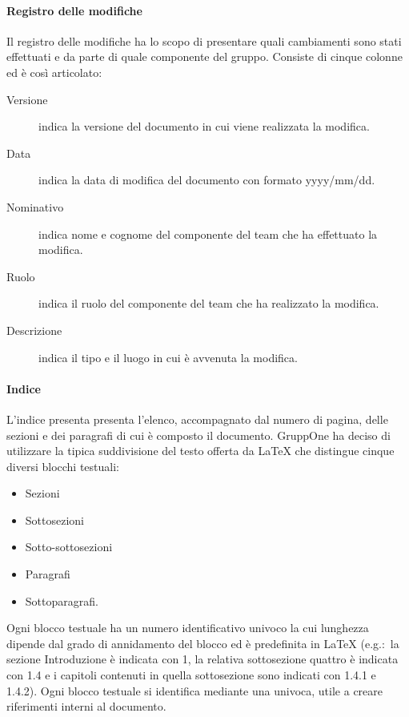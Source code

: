 \documentclass[../norme-di-progetto.tex]{subfiles}
\begin{document}
\paragraph{Registro delle modifiche}%
\label{par:registro_delle_modifiche}
Il registro delle modifiche ha lo scopo di presentare quali cambiamenti sono stati effettuati e da parte di quale componente del gruppo. Consiste di cinque colonne ed è così articolato:
\begin{description}
  \item [Versione] indica la versione del documento in cui viene realizzata la modifica.
  \item [Data] indica la data di modifica del documento con formato yyyy/mm/dd.
  \item [Nominativo] indica nome e cognome del componente del team che ha effettuato la modifica.
  \item [Ruolo] indica il ruolo del componente del team che ha realizzato la modifica.
  \item [Descrizione] indica il tipo e il luogo in cui è avvenuta la modifica.
\end{description}

\paragraph{Indice}%
\label{par:indice}
L'indice presenta presenta l'elenco, accompagnato dal numero di pagina, delle sezioni e dei paragrafi di cui è composto il documento.
GruppOne ha deciso di utilizzare la tipica suddivisione del testo offerta da \LaTeX{} che distingue cinque diversi blocchi testuali:
\begin{itemize}
  \item Sezioni
  \item Sottosezioni
  \item Sotto-sottosezioni
  \item Paragrafi
  \item Sottoparagrafi.
\end{itemize}

Ogni blocco testuale ha un numero identificativo univoco la cui lunghezza dipende dal grado di annidamento del blocco ed è predefinita in \LaTeX{} (e.g.:\ la sezione Introduzione è indicata con 1, la relativa sottosezione quattro è indicata con 1.4 e i capitoli contenuti in quella sottosezione sono indicati con 1.4.1 e 1.4.2).
Ogni blocco testuale si identifica mediante una  univoca, utile a creare riferimenti interni al documento.
\end{document}
